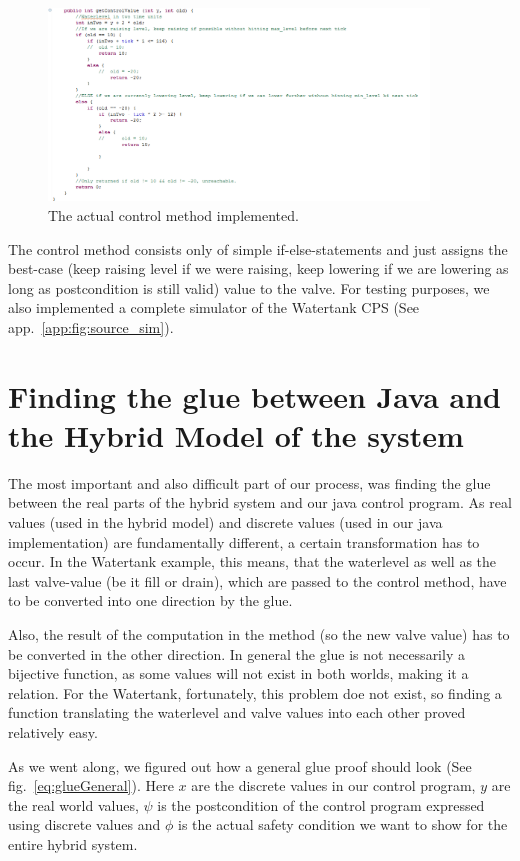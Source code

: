 \begin{figure}
	\centering
	\includegraphics[width=0.9\textwidth]{images/source_control_method}
	\caption{The actual control method implemented.}
	\label{fig:source_controlMethod}
\end{figure}
The control method consists only of simple if-else-statements and just assigns the best-case (keep raising level if we were raising, keep lowering if we are lowering as long as postcondition is still valid) value to the valve.
For testing purposes, we also implemented a complete simulator of the Watertank CPS (See app.~\ref{app:fig:source_sim}).

\section{Finding the glue between Java and the Hybrid Model of the system}
\label{sec:Watertank:Glue}

The most important and also difficult part of our process, was finding the glue between the real parts of the hybrid system and our java control program. As real values (used in the hybrid model) and discrete values (used in our java implementation) are fundamentally different, a certain transformation has to occur.  In the Watertank example, this means, that the waterlevel as well as the last valve-value (be it fill or drain), which are passed to the control method, have to be converted into one direction by the glue. 

Also, the result of the computation in the method (so the new valve value) has to be converted in the other direction. In general the glue is not necessarily a bijective function, as some values will not exist in both worlds, making it a relation. For the Watertank, fortunately, this problem doe not exist, so finding a function translating the waterlevel and valve values into each other proved relatively easy. 

As we went along, we figured out how a general glue proof should look (See fig.~\ref{eq:glueGeneral}). Here \(x\) are the discrete values in our control program, \(y\) are the real world values, \(\psi\) is the postcondition of the control program expressed using discrete values and \(\phi\) is the actual safety condition we want to show for the entire hybrid system.

